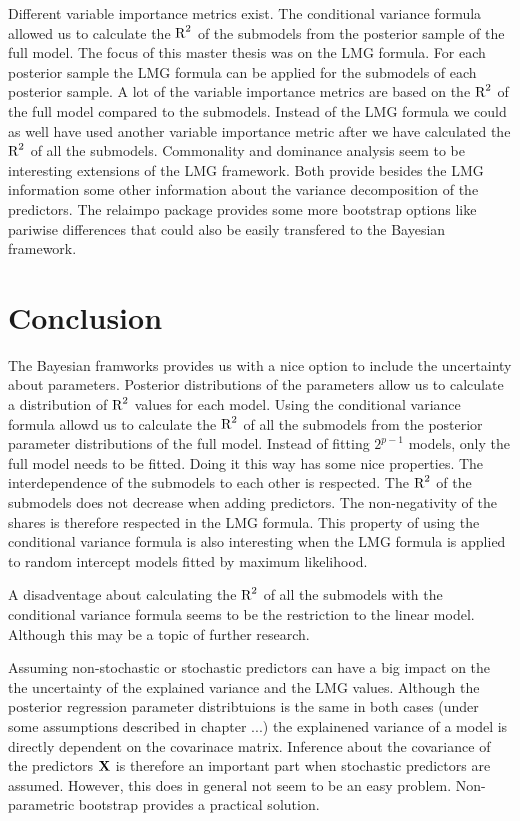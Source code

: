 \documentclass[11pt,a4paper,twoside]{book}\usepackage[]{graphicx}\usepackage[]{color}
\begin{document}
Different variable importance metrics exist. The conditional variance formula allowed us to calculate the $\text{R}^2$ of the submodels from the posterior sample of the full model. The focus of this master thesis was on the LMG formula. For each posterior sample the LMG formula can be applied for the submodels of each posterior sample. A lot of the variable importance metrics are based on the $\text{R}^2$ of the full model compared to the submodels. Instead of the LMG formula we could as well have used another variable importance metric after we have calculated the $\text{R}^2$ of all the submodels. Commonality and dominance analysis seem to be interesting extensions of the LMG framework. Both provide besides the LMG information some other information about the variance decomposition of the predictors. The relaimpo package provides some more bootstrap options like pariwise differences that could also be easily transfered to the Bayesian framework. 


 
\section{Conclusion}

The Bayesian framworks provides us with a nice option to include the uncertainty about parameters. Posterior distributions of the parameters allow us to calculate a distribution of $\text{R}^2$ values for each model. Using  the conditional variance formula allowd us to calculate the $\text{R}^2$ of all the submodels from the posterior parameter distributions of the full model. Instead of fitting $2^
{p-1}$ models, only the full model needs to be fitted. Doing it this way has some nice properties. The interdependence of the submodels to each other is respected. The $\text{R}^2$ of the submodels does not decrease when adding predictors. The non-negativity of the shares is therefore respected in the LMG formula. This property of using the conditional variance formula is also interesting when the LMG formula is applied to random intercept models fitted by maximum likelihood. 

A disadventage about calculating the $\text{R}^2$ of all the submodels with the conditional variance formula  seems to be the restriction to the linear model. Although this may be a topic of further research.

Assuming non-stochastic or stochastic predictors can have a big impact on the the uncertainty of the explained variance and the LMG values. Although the posterior regression parameter distribtuions is the same in both cases (under some assumptions described in chapter ...) the explainened variance of a model is directly dependent on the covarinace matrix. Inference about the covariance of the predictors ${\mathbf{X}}$ is therefore an important part when stochastic predictors are assumed. However, this does in general not seem to be an easy problem. Non-parametric bootstrap provides a practical solution. 
\end{document}
